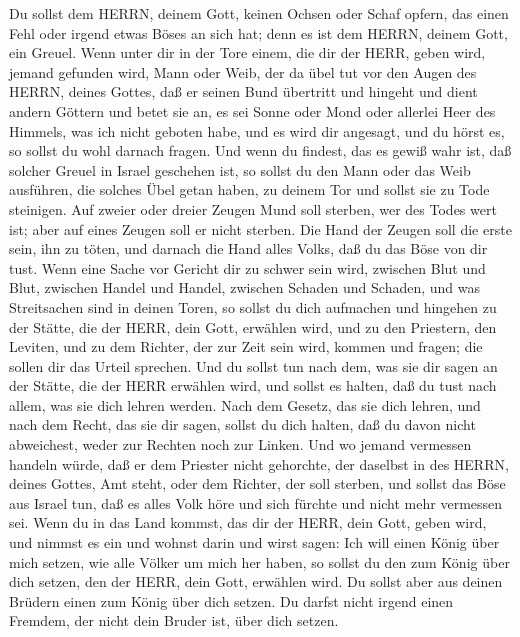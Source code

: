  Du sollst dem HERRN, deinem Gott, keinen Ochsen oder Schaf
opfern, das einen Fehl oder irgend etwas Böses an sich hat; denn es ist
dem HERRN, deinem Gott, ein Greuel.  Wenn unter dir in der
Tore einem, die dir der HERR, geben wird, jemand gefunden wird, Mann
oder Weib, der da übel tut vor den Augen des HERRN, deines Gottes, daß
er seinen Bund übertritt  und hingeht und dient andern
Göttern und betet sie an, es sei Sonne oder Mond oder allerlei Heer des
Himmels, was ich nicht geboten habe,  und es wird dir
angesagt, und du hörst es, so sollst du wohl darnach fragen. Und wenn du
findest, das es gewiß wahr ist, daß solcher Greuel in Israel geschehen
ist,  so sollst du den Mann oder das Weib ausführen, die
solches Übel getan haben, zu deinem Tor und sollst sie zu Tode
steinigen.  Auf zweier oder dreier Zeugen Mund soll sterben,
wer des Todes wert ist; aber auf eines Zeugen soll er nicht sterben.
 Die Hand der Zeugen soll die erste sein, ihn zu töten, und
darnach die Hand alles Volks, daß du das Böse von dir tust. 
Wenn eine Sache vor Gericht dir zu schwer sein wird, zwischen Blut und
Blut, zwischen Handel und Handel, zwischen Schaden und Schaden, und was
Streitsachen sind in deinen Toren, so sollst du dich aufmachen und
hingehen zu der Stätte, die der HERR, dein Gott, erwählen wird,
 und zu den Priestern, den Leviten, und zu dem Richter, der
zur Zeit sein wird, kommen und fragen; die sollen dir das Urteil
sprechen.  Und du sollst tun nach dem, was sie dir sagen an
der Stätte, die der HERR erwählen wird, und sollst es halten, daß du
tust nach allem, was sie dich lehren werden.  Nach dem
Gesetz, das sie dich lehren, und nach dem Recht, das sie dir sagen,
sollst du dich halten, daß du davon nicht abweichest, weder zur Rechten
noch zur Linken.  Und wo jemand vermessen handeln würde,
daß er dem Priester nicht gehorchte, der daselbst in des HERRN, deines
Gottes, Amt steht, oder dem Richter, der soll sterben, und sollst das
Böse aus Israel tun,  daß es alles Volk höre und sich
fürchte und nicht mehr vermessen sei.  Wenn du in das Land
kommst, das dir der HERR, dein Gott, geben wird, und nimmst es ein und
wohnst darin und wirst sagen: Ich will einen König über mich setzen, wie
alle Völker um mich her haben,  so sollst du den zum König
über dich setzen, den der HERR, dein Gott, erwählen wird. Du sollst aber
aus deinen Brüdern einen zum König über dich setzen. Du darfst nicht
irgend einen Fremdem, der nicht dein Bruder ist, über dich setzen.
